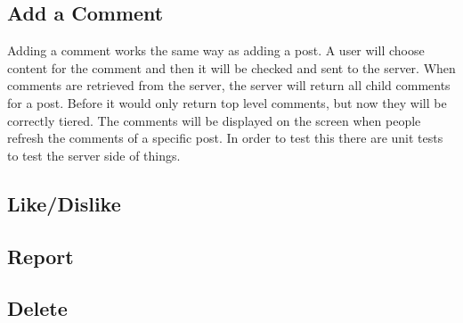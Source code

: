 \documentclass[12pt]{article}
\begin{document}
\subsection{Add a Comment}

Adding a comment works the same way as adding a post.  A user will choose content for the comment and then it will be checked and sent to the server.  When comments are retrieved from the server, the server will return all child comments for a post.  Before it would only return top level comments, but now they will be correctly tiered.  The comments will be displayed on the screen when people refresh the comments of a specific post.  In order to test this there are unit tests to test the server side of things.

\subsection{Like/Dislike}

\subsection{Report}

\subsection{Delete}
\end{document}
